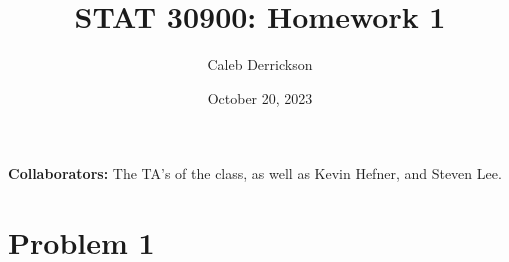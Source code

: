 

\title{STAT 30900: Homework 1}
\author{Caleb Derrickson}
\date{October 20, 2023}


\onehalfspacing
\maketitle

{\color{cit}\vspace{2mm}\noindent\textbf{Collaborators:}} The TA's of the class, as well as Kevin Hefner, and Steven Lee.

\tableofcontents

\newpage
\section{Problem 1}

